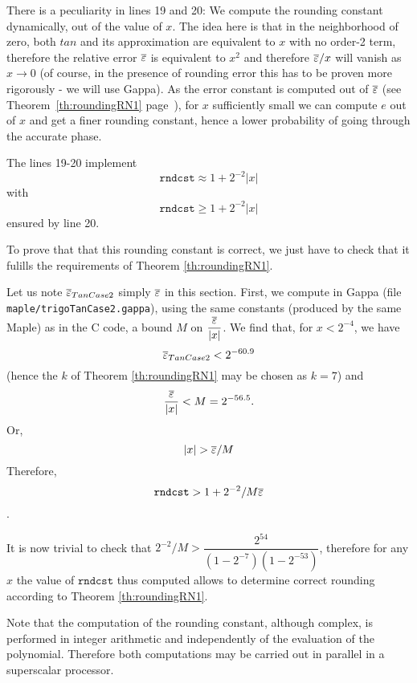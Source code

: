 There is a peculiarity in lines 19 and 20: We compute the rounding
constant dynamically, out of the value of $x$. The idea here is that
in the neighborhood of zero, both $tan$ and its approximation are
equivalent to $x$ with no order-2 term, therefore the relative error
${\overline{\varepsilon}}$ is equivalent to $x^2$ and therefore ${\overline{\varepsilon}}/x$ will vanish
as $x\rightarrow 0$ (of course, in the presence of rounding error this
has to be proven more rigorously - we will use Gappa).  As the error constant is computed
out of ${\overline{\varepsilon}}$ (see Theorem~\ref{th:roundingRN1}
page~\pageref{th:roundingRN1}), for $x$ sufficiently small we can
compute $e$ out of $x$ and get a finer rounding constant, hence a
lower probability of going through the accurate phase.

The lines 19-20 implement $$\mathtt{rndcst} \approx 1 + 2^{-2}|x|$$ 
with  
$$\mathtt{rndcst} \ge 1 + 2^{-2}|x|$$ ensured by line 20.

To prove that that this rounding constant is correct, we just have to
check that it fulills the requirements of Theorem \ref{th:roundingRN1}.

Let us note ${\overline{\varepsilon}}_{TanCase2}$ simply ${\overline{\varepsilon}}$ in this section.
First, we compute in Gappa (file\\ \texttt{maple/trigoTanCase2.gappa}),
using the same constants (produced by the same Maple) as in the C
code, a bound $M$ on $\dfrac{{\overline{\varepsilon}}}{|x|}$. We find that, for
$x<2^{-4}$, we have 
$${\overline{\varepsilon}}_{TanCase2} < 2^{-60.9} $$
(hence the $k$ of Theorem \ref{th:roundingRN1} may be chosen as $k=7$) and
$$\dfrac{{\overline{\varepsilon}}}{|x|} < M=2^{-56.5} .$$
Or, $$|x| > {\overline{\varepsilon}}/M$$
Therefore, 
$$\mathtt{rndcst} > 1 + 2^{-2}/M{\overline{\varepsilon}}$$. 

It is now trivial to check that $2^{-2}/M >
\dfrac{2^{54}}{(1-2^{-7})(1-2^{-53})}$, therefore for any $x$
the value of $\mathtt{rndcst}$ thus computed allows to determine
correct rounding according to Theorem \ref{th:roundingRN1}. 



Note that the computation of the rounding constant, although complex, is performed in
integer arithmetic and independently of the evaluation of the polynomial.
Therefore both computations may be carried out in parallel in a superscalar processor.

